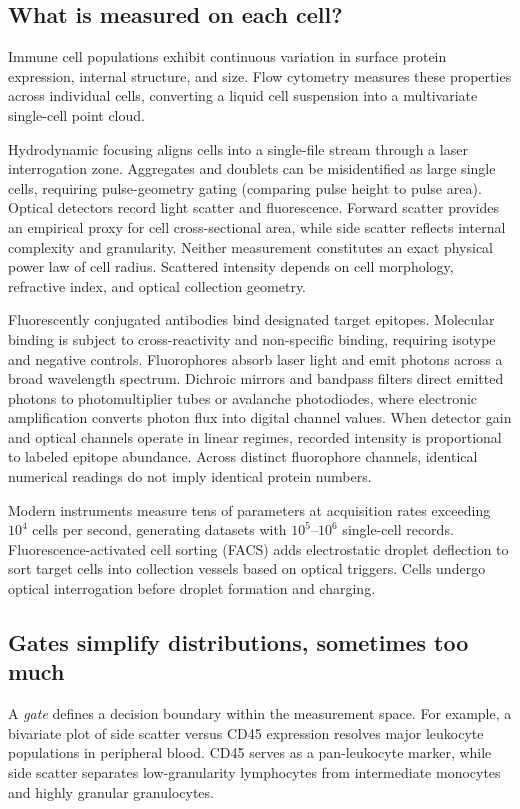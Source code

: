 \subsection{What is measured on each cell?}
\label{subsec:l05-instrument}
Immune cell populations exhibit continuous variation in surface protein expression, internal structure, and size. Flow cytometry measures these properties across individual cells, converting a liquid cell suspension into a multivariate single-cell point cloud.

Hydrodynamic focusing aligns cells into a single-file stream through a laser interrogation zone. Aggregates and doublets can be misidentified as large single cells, requiring pulse-geometry gating (comparing pulse height to pulse area). Optical detectors record light scatter and fluorescence. Forward scatter provides an empirical proxy for cell cross-sectional area, while side scatter reflects internal complexity and granularity. Neither measurement constitutes an exact physical power law of cell radius. Scattered intensity depends on cell morphology, refractive index, and optical collection geometry.

Fluorescently conjugated antibodies bind designated target epitopes. Molecular binding is subject to cross-reactivity and non-specific binding, requiring isotype and negative controls. Fluorophores absorb laser light and emit photons across a broad wavelength spectrum. Dichroic mirrors and bandpass filters direct emitted photons to photomultiplier tubes or avalanche photodiodes, where electronic amplification converts photon flux into digital channel values. When detector gain and optical channels operate in linear regimes, recorded intensity is proportional to labeled epitope abundance. Across distinct fluorophore channels, identical numerical readings do not imply identical protein numbers.

Modern instruments measure tens of parameters at acquisition rates exceeding $10^4$ cells per second, generating datasets with $10^5$--$10^6$ single-cell records. Fluorescence-activated cell sorting (FACS) adds electrostatic droplet deflection to sort target cells into collection vessels based on optical triggers. Cells undergo optical interrogation before droplet formation and charging.

\subsection{Gates simplify distributions, sometimes too much}
\label{subsec:l05-gates}
A \emph{gate} defines a decision boundary within the measurement space. For example, a bivariate plot of side scatter versus CD45 expression resolves major leukocyte populations in peripheral blood. CD45 serves as a pan-leukocyte marker, while side scatter separates low-granularity lymphocytes from intermediate monocytes and highly granular granulocytes.

